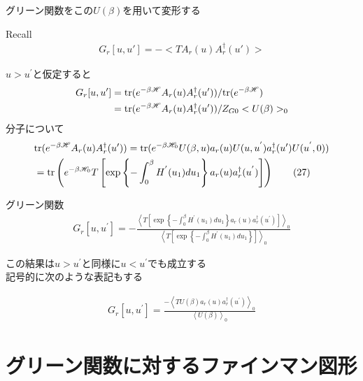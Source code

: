 \documentclass[dvipdfmx,10pt]{beamer}
\begin{document}
\begin{frame}
    グリーン関数をこの$U(\beta)$を用いて変形する
    \begin{block}{Recall}
        \begin{align}
            G_r[u,u'] = -<TA_r(u)A_r^{\dagger}(u')> \tag{1}
        \end{align}
    \end{block}
    $u>u^{'}$と仮定すると
    \begin{align*}
        G_r[u,u'] &= {\rm tr}(e^{-\beta\mathscr{H}}A_r(u)A_r^{\dagger}(u'))/{\rm tr}(e^{-\beta\mathscr{H}})\nonumber\\
        &= {\rm tr}(e^{-\beta\mathscr{H}}A_r(u)A_r^{\dagger}(u'))/Z_{G0}<U(\beta)>_0 \nonumber
    \end{align*}
    分子について
    \begin{align*}
        &{\rm tr}(e^{-\beta\mathscr{H}}A_r(u)A_r^{\dagger}(u')) = {\rm tr}(e^{-\beta\mathscr{H}_0}U(\beta,u)a_r(u)U(u,u^{'})a_r^{\dagger}(u')U(u^{'},0)) \nonumber\\
        &= {\rm tr}\left(e^{-\beta\mathscr{H}_0}T\left[\exp\left\{-\int_0^{\beta}H^{'}(u_1)du_1\right\}a_r(u)a_r^{\dagger}(u^{'})\right]\right) \tag{27}
    \end{align*}
\end{frame}
\begin{frame}
    \begin{block}{グリーン関数}
        \begin{align*}
            G_r[u,u^{'}] = -\frac{\left<T\left[\exp\left\{-\int_0^{\beta}H^{'}(u_1)du_1\right\}a_r(u)a_r^{\dagger}(u^{'})\right]\right>_0}{\left<T\left[\exp\left\{-\int_0^{\beta}H^{'}(u_1)du_1\right\}\right]\right>_0} \tag{28}
        \end{align*}
    \end{block}
    この結果は$u>u^{'}$と同様に$u<u^{'}$でも成立する\\
    記号的に次のような表記もする
    \begin{block}{}
        \begin{align*}
            G_r[u,u^{'}] = \frac{-\left<TU(\beta)a_r(u)a_r^{\dagger}(u^{'})\right>_0}{\left<U(\beta)\right>_0} \tag{29}
        \end{align*}
    \end{block}
\end{frame}


\section{グリーン関数に対するファインマン図形}
\end{document}
